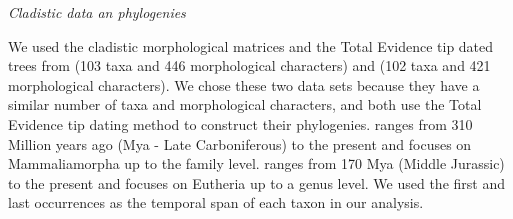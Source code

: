 \documentclass[12pt,letterpaper]{article}
\renewcommand{\subsection}[1]{%
\bigskip
\begin{center}
\begin{large}
\normalfont\itshape #1
\end{large}
\end{center}}
\begin{document}

\subsection{Cladistic data an phylogenies}
We used the cladistic morphological matrices and the Total Evidence tip dated trees \citep{ronquista2012} from \citep{Slater2012MEE} (103 taxa and 446 morphological characters) and \citep{beckancient2014} (102 taxa and 421 morphological characters). We chose these two data sets because they have a similar number of taxa and morphological characters, and both use the Total Evidence tip dating method \citep{ronquista2012} to construct their phylogenies. \citep{Slater2012MEE} ranges from 310 Million years ago (Mya - Late Carboniferous) to the present and focuses on Mammaliamorpha up to the family level. \citep{beckancient2014} ranges from 170 Mya (Middle Jurassic) to the present and focuses on Eutheria up to a genus level. We used the first and last occurrences as the temporal span of each taxon in our analysis.
\end{document}
